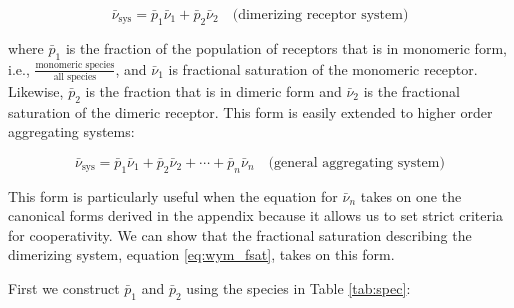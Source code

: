 \begin{equation}
	\bar{\nu}_{\text{sys}} = \bar{p}_1 \bar{\nu}_1 + \bar{p}_2 \bar{\nu}_2 \quad \text{(dimerizing receptor system)}
\end{equation}

where \(\bar{p}_1\) is the fraction of the population of receptors that is in monomeric form, i.e., \(\frac{\text{monomeric species}}{\text{all species}}\), and \(\bar{\nu}_1\) is fractional saturation of the monomeric receptor. Likewise, \(\bar{p}_2\) is the fraction that is in dimeric form and \(\bar{\nu}_2\) is the fractional saturation of the dimeric receptor. This form is easily extended to higher order aggregating systems:

\begin{equation}
	\bar{\nu}_{\text{sys}} = \bar{p}_1 \bar{\nu}_1 + \bar{p}_2 \bar{\nu}_2 + \cdots + \bar{p}_n \bar{\nu}_n \quad \text{(general aggregating system)}
\end{equation}


This form is particularly useful when the equation for \(\bar{\nu}_n\) takes on one the canonical forms derived in the appendix because it allows us to set strict criteria for cooperativity. We can show that the fractional saturation describing the dimerizing system, equation \ref{eq:wym_fsat}, takes on this form.

First we construct \(\bar{p}_1\) and \(\bar{p}_2\) using the species in Table \ref{tab:spec}:


